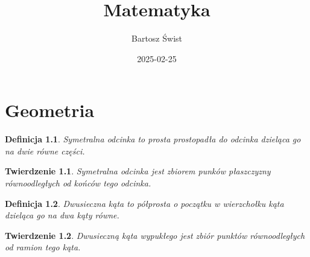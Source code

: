 \documentclass{report}
\title{Matematyka}
\date{2025-02-25}
\author{Bartosz Świst}
\newtheorem*{definition}{Definicja}
\newtheorem{theorem}{Twierdzenie}
\begin{document}
  \maketitle

  \chapter{Geometria}
    \begin{definition}
      Symetralna odcinka to prosta prostopadła do odcinka dzieląca go na dwie równe części.
    \end{definition}
    \begin{theorem}
      Symetralna odcinka jest zbiorem punków płaszczyzny równoodległych od końców tego odcinka.
    \end{theorem}
    \begin{definition}
      Dwusieczna kąta to półprosta o początku w wierzchołku kąta dzieląca go na dwa kąty równe.
    \end{definition}
    \begin{theorem}
      Dwusieczną kąta wypukłego jest zbiór punktów równoodległych od ramion tego kąta.
    \end{theorem}
    \begin{center}
    \end{center}
\end{document}
